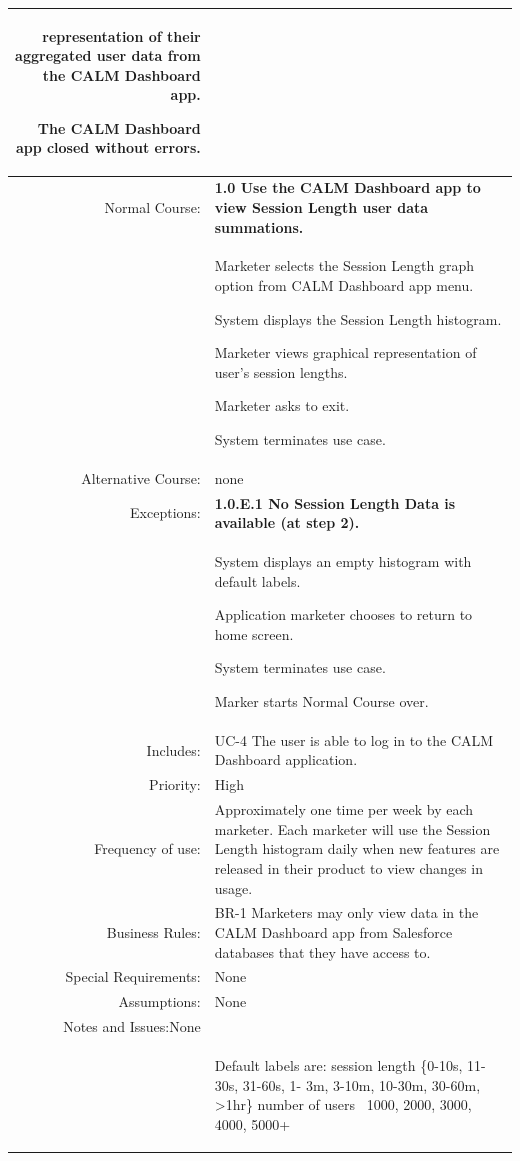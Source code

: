 \documentclass[12pt,oneside,letterpaper]{article}
\newenvironment{packed_enumerate}{ %
\vspace{-7mm}
\begin{enumerate}
  \setlength{\itemsep}{0pt}
  \setlength{\parskip}{0pt}
  \setlength{\parsep}{0pt}
}{\end{enumerate}
\vspace{-8mm}}
\begin{document}
\begin{longtable}{|r|p{3.8in}|}
\begin{packed_enumerate}
representation of their aggregated user data from the CALM Dashboard 
app.
\item The CALM Dashboard app closed without errors.
\end{packed_enumerate}\\
\hline
Normal Course:&\textbf{1.0 Use the CALM Dashboard app to view Session 
Length user data summations.}\\
&
\begin{packed_enumerate}
\item Marketer selects the Session Length graph option from CALM 
Dashboard app menu.
\item System displays the Session Length histogram.
\item Marketer views graphical representation of user's session 
lengths.
\item Marketer asks to exit.
\item System terminates use case.
\end{packed_enumerate}\\
\hline
Alternative Course:&none\\
\hline
Exceptions:&\textbf{1.0.E.1 No Session Length Data is available (at 
step 2).}\\
&
\begin{packed_enumerate} %
\item System displays an empty histogram with default labels. 
\item Application marketer chooses to return to home screen.
\item System terminates use case.
\item Marker starts Normal Course over. 
\end{packed_enumerate}\\
\hline
Includes:&UC-4 The user is able to log in to the CALM Dashboard 
application.\\
\hline
Priority:&High\\
\hline
Frequency of use:&Approximately one time per week by each marketer. 
Each marketer will use the Session Length histogram daily when new 
features are released in their product to view changes in usage.\\
\hline
Business Rules:&BR-1 Marketers may only view data in the CALM 
Dashboard app from Salesforce databases that they have access to. \\
\hline
Special Requirements:&None\\
\hline
Assumptions:&None\\
\hline
Notes and Issues:None&\\
&
\begin{packed_enumerate}
\item Default labels are: session length \{0-10s, 11-30s, 31-60s, 1- 3m, 3-10m, 10-30m, 30-60m, \textgreater1hr\}    number of users \ {1000, 2000, 3000, 4000, 5000+}
\end{packed_enumerate}\\
\hline
\end{longtable}
\end{document}
